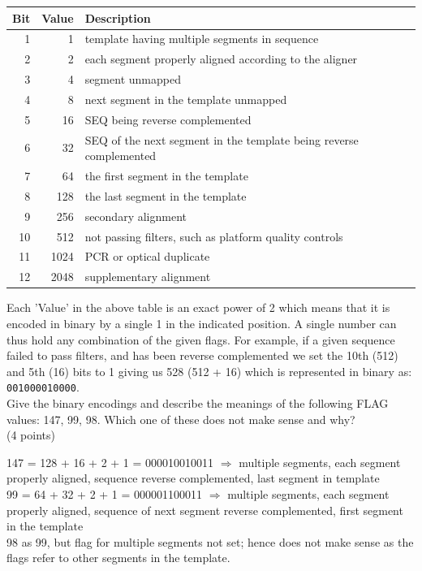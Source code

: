 \documentclass[11pt]{article}
\begin{document}
\begin{enumerate}
  {\small
  \begin{tabular}{rrl}
    Bit & Value & Description\\
    \hline
    1 & 1 & template having multiple segments in sequence \\
    2 & 2 & each segment properly aligned according to the aligner\\
    3 & 4 & segment unmapped\\
    4 & 8 & next segment in the template unmapped\\
    5 & 16 & SEQ being reverse complemented\\
    6 & 32 & SEQ of the next segment in the template being reverse complemented\\
    7 & 64 & the first segment in the template\\
    8 & 128 & the last segment in the template\\
    9 & 256 & secondary alignment\\
    10 & 512 & not passing filters, such as platform quality controls\\
    11 & 1024 & PCR or optical duplicate\\
    12 & 2048 & supplementary alignment\\
  \end{tabular}
  }

  Each 'Value' in the above table is an exact power of 2 which means that it
  is encoded in binary by a single 1 in the indicated position. A single
  number can thus hold any combination of the given flags. For example, if a
  given sequence failed to pass filters, and has been reverse complemented we
  set the 10th (512) and 5th (16) bits to 1 giving us 528 (512 +
  16) which is represented in binary as: \verb|001000010000|.\\ 
  Give the binary encodings and describe the meanings of the following 
  FLAG values: 147, 99, 98. Which one of these does not make sense and why?\\ 
  (4 points)

\begin{Notes}
  147 = 128 + 16 + 2 + 1 = 000010010011 $\Rightarrow$ multiple segments,
  each segment properly aligned, sequence reverse complemented, last segment
  in template\\
  99 = 64 + 32 + 2 + 1 = 000001100011 $\Rightarrow$ multiple segments,
  each segment properly aligned, sequence of next segment reverse
  complemented, first segment in the template\\
  98 as 99, but flag for multiple segments not set; hence does not make
  sense as the flags refer to other segments in the template.
\end{Notes}

\end{enumerate}
\end{document}
